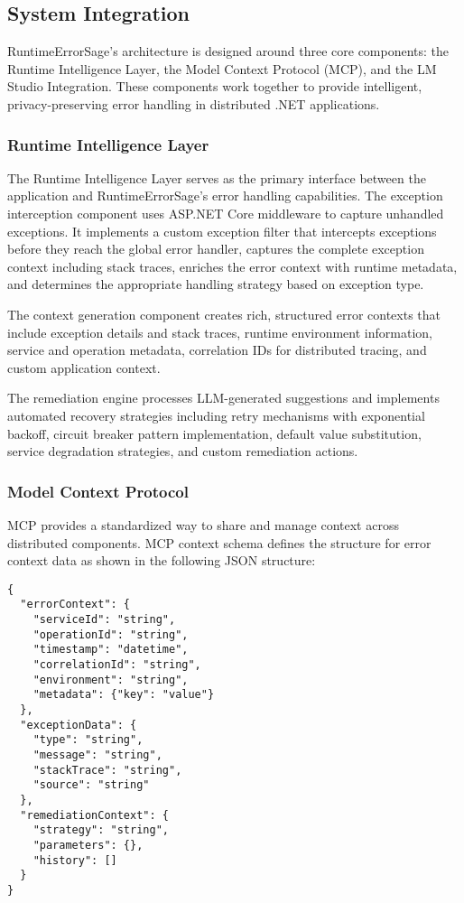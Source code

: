 \subsection{System Integration}
RuntimeErrorSage's architecture is designed around three core components: the Runtime Intelligence Layer, the Model Context Protocol (MCP), and the LM Studio Integration. These components work together to provide intelligent, privacy-preserving error handling in distributed .NET applications.

\subsubsection{Runtime Intelligence Layer}
The Runtime Intelligence Layer serves as the primary interface between the application and RuntimeErrorSage's error handling capabilities. The exception interception component uses ASP.NET Core middleware to capture unhandled exceptions. It implements a custom exception filter that intercepts exceptions before they reach the global error handler, captures the complete exception context including stack traces, enriches the error context with runtime metadata, and determines the appropriate handling strategy based on exception type.

The context generation component creates rich, structured error contexts that include exception details and stack traces, runtime environment information, service and operation metadata, correlation IDs for distributed tracing, and custom application context.

The remediation engine processes LLM-generated suggestions and implements automated recovery strategies including retry mechanisms with exponential backoff, circuit breaker pattern implementation, default value substitution, service degradation strategies, and custom remediation actions.

\subsubsection{Model Context Protocol}
MCP provides a standardized way to share and manage context across distributed components. MCP context schema defines the structure for error context data as shown in the following JSON structure:

\begin{lstlisting}[style=jsonstyle,caption={MCP Context Schema},label=lst:mcp-schema]
{
  "errorContext": {
    "serviceId": "string",
    "operationId": "string", 
    "timestamp": "datetime",
    "correlationId": "string",
    "environment": "string",
    "metadata": {"key": "value"}
  },
  "exceptionData": {
    "type": "string",
    "message": "string", 
    "stackTrace": "string",
    "source": "string"
  },
  "remediationContext": {
    "strategy": "string",
    "parameters": {},
    "history": []
  }
}
\end{lstlisting}

